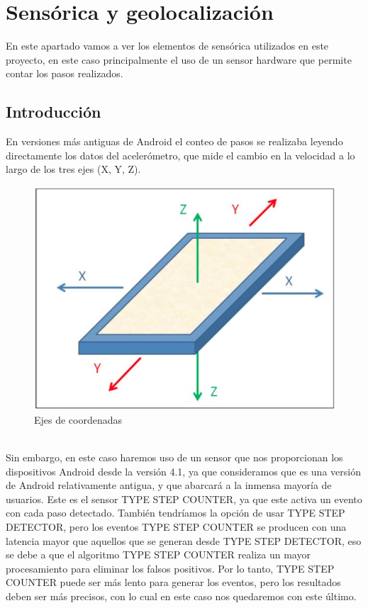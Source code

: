 \documentclass[12pt, a4paper, titlepage]{article}
\begin{document}
    \section{Sensórica y geolocalización}
		En este apartado vamos a ver los elementos de sensórica utilizados en este proyecto, en este caso principalmente el uso de un sensor hardware que permite contar los pasos realizados.
    	\newline
    	\subsection{Introducción}
    	En versiones más antiguas de Android el conteo de pasos se realizaba leyendo directamente los datos del acelerómetro, que mide el cambio en la velocidad a lo largo de los tres ejes (X, Y, Z).
    	\newline
    	\begin{figure}[h!]
    		\begin{center}
    			\includegraphics[scale=0.65]{img/ejes.png}
    			\caption{Ejes de coordenadas}
    		\end{center}
    	\end{figure}\\

    	Sin embargo, en este caso haremos uso de un sensor que nos proporcionan los dispositivos Android desde la versión 4.1, ya que consideramos que es una versión de Android relativamente antigua, y que abarcará a la inmensa mayoría de usuarios. Este es el sensor TYPE STEP COUNTER, ya que este activa un evento con cada paso detectado. También tendríamos la opción de usar TYPE STEP DETECTOR, pero los eventos TYPE STEP COUNTER se producen con una latencia mayor que aquellos que se generan desde TYPE STEP DETECTOR, eso se debe a que el algoritmo TYPE STEP COUNTER realiza un mayor procesamiento para eliminar los falsos positivos. Por lo tanto, TYPE STEP COUNTER puede ser más lento para generar los eventos, pero los resultados deben ser más precisos, con lo cual en este caso nos quedaremos con este último.
\end{document}
